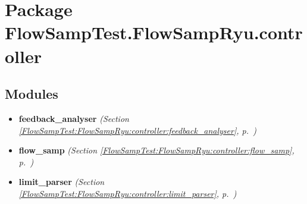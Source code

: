 %
%
%


\section{Package FlowSampTest.FlowSampRyu.controller}

    \label{FlowSampTest:FlowSampRyu:controller}


\subsection{Modules}

\begin{itemize}
\setlength{\parskip}{0ex}
\item \textbf{feedback\_analyser}
  \textit{(Section \ref{FlowSampTest:FlowSampRyu:controller:feedback_analyser}, p.~\pageref{FlowSampTest:FlowSampRyu:controller:feedback_analyser})}

\item \textbf{flow\_samp}
  \textit{(Section \ref{FlowSampTest:FlowSampRyu:controller:flow_samp}, p.~\pageref{FlowSampTest:FlowSampRyu:controller:flow_samp})}

\item \textbf{limit\_parser}
  \textit{(Section \ref{FlowSampTest:FlowSampRyu:controller:limit_parser}, p.~\pageref{FlowSampTest:FlowSampRyu:controller:limit_parser})}

\end{itemize}




